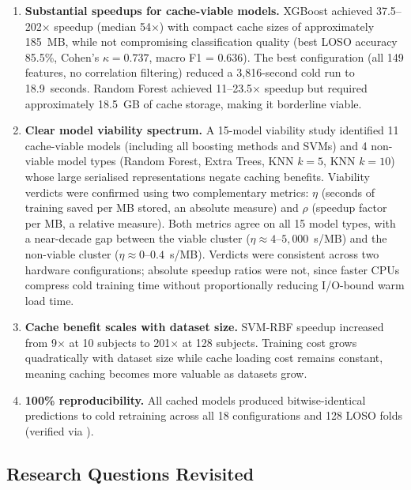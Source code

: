 \begin{enumerate}
\item \textbf{Substantial speedups for cache-viable models.}
 XGBoost achieved 37.5--202$\times$ speedup (median 54$\times$) with
 compact cache sizes of approximately 185~MB, while not compromising
 classification quality (best LOSO accuracy 85.5\%, Cohen's
 $\kappa = 0.737$, macro F1 = 0.636). The best configuration
 (all 149 features, no correlation filtering) reduced a 3{,}816-second
 cold run to 18.9~seconds. Random Forest achieved 11--23.5$\times$
 speedup but required approximately 18.5~GB of cache storage, making
 it borderline viable.

\item \textbf{Clear model viability spectrum.}
 A 15-model viability study identified 11 cache-viable models
 (including all boosting methods and SVMs) and 4 non-viable model
 types (Random Forest, Extra Trees, KNN $k=5$, KNN $k=10$) whose
 large serialised representations negate caching benefits. Viability
 verdicts were confirmed using two complementary metrics: $\eta$
 (seconds of training saved per MB stored, an absolute measure) and
 $\rho$ (speedup factor per MB, a relative measure). Both metrics
 agree on all 15 model types, with a near-decade gap between the
 viable cluster ($\eta \approx 4$--$5{,}000$~s/MB) and the non-viable
 cluster ($\eta \approx 0$--$0.4$~s/MB). Verdicts were consistent
 across two hardware configurations; absolute speedup ratios were not,
 since faster CPUs compress cold training time without proportionally
 reducing I/O-bound warm load time.

\item \textbf{Cache benefit scales with dataset size.}
 SVM-RBF speedup increased from 9$\times$ at 10 subjects to
 201$\times$ at 128 subjects. Training cost grows quadratically with
 dataset size while cache loading cost remains constant, meaning
 caching becomes more valuable as datasets grow.

\item \textbf{100\% reproducibility.}
 All cached models produced bitwise-identical predictions to cold
 retraining across all 18 configurations and 128 LOSO folds (verified
 via ).
\end{enumerate}

\subsection{Research Questions Revisited}

